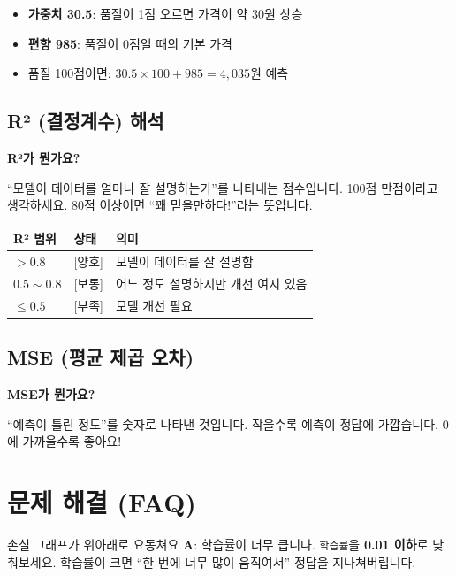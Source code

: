 \documentclass[11pt,a4paper]{article}
\begin{document}
\begin{itemize}
    \item \textbf{가중치 30.5}: 품질이 1점 오르면 가격이 약 30원 상승
    \item \textbf{편향 985}: 품질이 0점일 때의 기본 가격
    \item 품질 100점이면: $30.5 \times 100 + 985 = 4,035$원 예측
\end{itemize}

\subsection{R² (결정계수) 해석}

\begin{tipbox}
\textbf{R²가 뭔가요?}

``모델이 데이터를 얼마나 잘 설명하는가''를 나타내는 점수입니다.
100점 만점이라고 생각하세요. 80점 이상이면 ``꽤 믿을만하다!''라는 뜻입니다.
\end{tipbox}

\begin{center}
\begin{tabular}{lll}
\toprule
\textbf{R² 범위} & \textbf{상태} & \textbf{의미} \\
\midrule
$> 0.8$ & [양호] & 모델이 데이터를 잘 설명함 \\
$0.5 \sim 0.8$ & [보통] & 어느 정도 설명하지만 개선 여지 있음 \\
$\leq 0.5$ & [부족] & 모델 개선 필요 \\
\bottomrule
\end{tabular}
\end{center}

\subsection{MSE (평균 제곱 오차)}

\begin{tipbox}
\textbf{MSE가 뭔가요?}

``예측이 틀린 정도''를 숫자로 나타낸 것입니다. 
작을수록 예측이 정답에 가깝습니다. 0에 가까울수록 좋아요!
\end{tipbox}

\section{문제 해결 (FAQ)}

\begin{faqbox}{손실 그래프가 위아래로 요동쳐요}
\textbf{A}: 학습률이 너무 큽니다. 
\texttt{학습률}을 \textbf{0.01 이하}로 낮춰보세요. 
학습률이 크면 ``한 번에 너무 많이 움직여서'' 정답을 지나쳐버립니다.
\end{faqbox}
\end{document}
